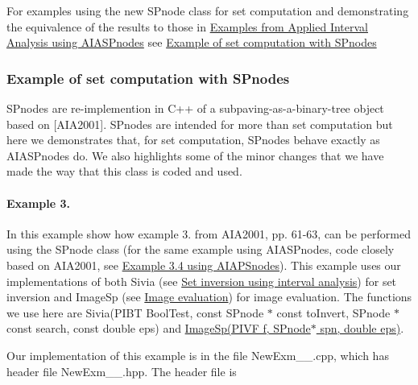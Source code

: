 \-For examples using the new \-S\-Pnode class for set computation and demonstrating the equivalence of the results to those in \hyperlink{AIASubPavings_AIAsec_examples}{\-Examples from \-Applied \-Interval \-Analysis using \-A\-I\-A\-S\-Pnodes} see \hyperlink{newsubpavings_newexamples}{\-Example of set computation with \-S\-Pnodes}\hypertarget{newsubpavings_newexamples}{}\subsubsection{\-Example of set computation with S\-Pnodes}\label{newsubpavings_newexamples}
\-S\-Pnodes are re-\/implemention in \-C++ of a subpaving-\/as-\/a-\/binary-\/tree object based on \mbox{[}\-A\-I\-A2001\mbox{]}. \-S\-Pnodes are intended for more than set computation but here we demonstrates that, for set computation, \-S\-Pnodes behave exactly as \-A\-I\-A\-S\-Pnodes do. \-We also highlights some of the minor changes that we have made the way that this class is coded and used.\hypertarget{newsubpavings_newexamsec_3_4}{}\paragraph{\-Example 3.}\label{newsubpavings_newexamsec_3_4}
\-In this example show how example 3. from \-A\-I\-A2001, pp. 61-\/63, can be performed using the \-S\-Pnode class (for the same example using \-A\-I\-A\-S\-Pnodes, code closely based on \-A\-I\-A2001, see \hyperlink{AIASubPavings_AIAexample3_4}{\-Example 3.4 using \-A\-I\-A\-P\-Snodes}). \-This example uses our implementations of both \-Sivia (see \hyperlink{AIASubPavings_AIAsec_SIVIA}{\-Set inversion using interval analysis}) for set inversion and \-Image\-Sp (see \hyperlink{AIASubPavings_AIAsec_imageSp}{\-Image evaluation}) for image evaluation. \-The functions we use here are \-Sivia(\-P\-I\-B\-T \-Bool\-Test, const \-S\-Pnode $\ast$ const to\-Invert, \-S\-Pnode $\ast$ const search, const double eps) and \hyperlink{classsubpavings_1_1SPnode_a5e79ff65a692b09c98ff53264ddfba9f}{\-Image\-Sp(\-P\-I\-V\-F f, S\-Pnode$\ast$ spn, double eps)}.

\-Our implementation of this example is in the file \-New\-Exm\-\_\-\_.\-cpp, which has header file \-New\-Exm\-\_\-\_.\-hpp. \-The header file is




\begin{DoxyCodeInclude}

\end{DoxyCodeInclude}


